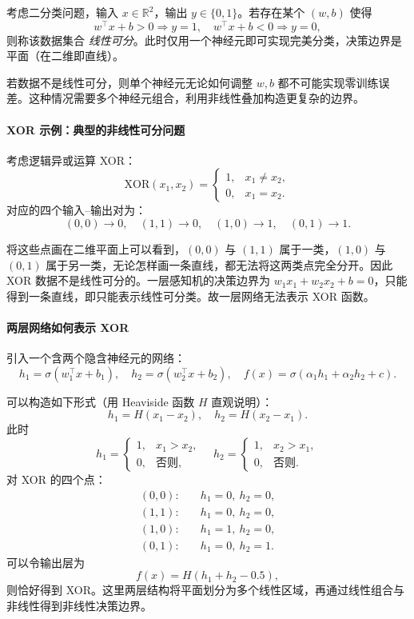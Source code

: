 考虑二分类问题，输入 $x\in\mathbb{R}^2$，输出 $y\in\{0,1\}$。若存在某个 $(w,b)$ 使得
\[
w^\top x + b > 0 \Rightarrow y=1,\quad w^\top x + b < 0 \Rightarrow y=0,
\]
则称该数据集合 \emph{线性可分}。此时仅用一个神经元即可实现完美分类，决策边界是平面（在二维即直线）。

若数据不是线性可分，则单个神经元无论如何调整 $w,b$ 都不可能实现零训练误差。这种情况需要多个神经元组合，利用非线性叠加构造更复杂的边界。

\paragraph{XOR 示例：典型的非线性可分问题}

考虑逻辑异或运算 XOR：
\[
\text{XOR}(x_1,x_2) = \begin{cases} 1, & x_1 \ne x_2,\\ 0, & x_1 = x_2. \end{cases}
\]
对应的四个输入--输出对为：
\[
(0,0)\to 0,\quad (1,1)\to 0,\quad (1,0)\to 1,\quad (0,1)\to 1.
\]

将这些点画在二维平面上可以看到，$(0,0)$ 与 $(1,1)$ 属于一类，$(1,0)$ 与 $(0,1)$ 属于另一类，无论怎样画一条直线，都无法将这两类点完全分开。因此 XOR 数据不是线性可分的。一层感知机的决策边界为 $w_1x_1 + w_2x_2 + b = 0$，只能得到一条直线，即只能表示线性可分类。故一层网络无法表示 XOR 函数。

\paragraph{两层网络如何表示 XOR}

引入一个含两个隐含神经元的网络：
\[
h_1 = \sigma(w_1^\top x + b_1), \quad h_2 = \sigma(w_2^\top x + b_2), \quad f(x) = \sigma(\alpha_1 h_1 + \alpha_2 h_2 + c).
\]

可以构造如下形式（用 Heaviside 函数 $H$ 直观说明）：
\[
h_1 = H(x_1 - x_2),\quad h_2 = H(x_2 - x_1).
\]
此时
\[
h_1 = \begin{cases} 1, & x_1 > x_2,\\ 0, & \text{否则}, \end{cases} \quad h_2 = \begin{cases} 1, & x_2 > x_1,\\ 0, & \text{否则}. \end{cases}
\]
对 XOR 的四个点：
\[
\begin{aligned}
(0,0): &\quad h_1=0,\ h_2=0,\\
(1,1): &\quad h_1=0,\ h_2=0,\\
(1,0): &\quad h_1=1,\ h_2=0,\\
(0,1): &\quad h_1=0,\ h_2=1.
\end{aligned}
\]
可以令输出层为
\[
f(x) = H(h_1 + h_2 - 0.5),
\]
则恰好得到 XOR。这里两层结构将平面划分为多个线性区域，再通过线性组合与非线性得到非线性决策边界。

